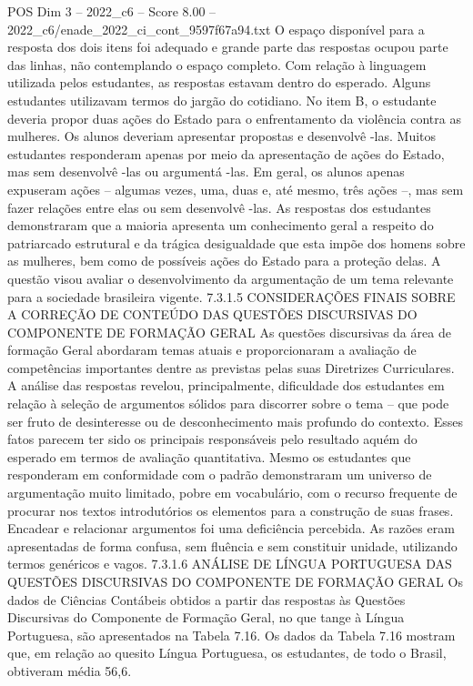 \begin{textsample}{POS Dim 3 – 2022\_c6 – Score 8.00 – 2022\_c6/enade\_2022\_ci\_cont\_9597f67a94.txt}
O espaço disponível para a resposta dos dois itens foi adequado e grande parte das respostas ocupou parte das linhas, não contemplando o espaço completo.
Com relação à linguagem utilizada pelos estudantes, as respostas estavam dentro do esperado.
Alguns estudantes utilizavam termos do jargão do cotidiano.
No item B, o estudante deveria propor duas ações do Estado para o enfrentamento da violência contra as mulheres.
Os alunos deveriam apresentar propostas e desenvolvê -las.
Muitos estudantes responderam apenas por meio da apresentação de ações do Estado, mas sem desenvolvê -las ou argumentá -las.
Em geral, os alunos apenas expuseram ações – algumas vezes, uma, duas e, até mesmo, três ações –, mas sem fazer relações entre elas ou sem desenvolvê -las.
As respostas dos estudantes demonstraram que a maioria apresenta um conhecimento geral a respeito do patriarcado estrutural e da trágica desigualdade que esta impõe dos homens sobre as mulheres, bem como de possíveis ações do Estado para a proteção delas.
A questão visou avaliar o desenvolvimento da argumentação de um tema relevante para a sociedade brasileira vigente. 7.3.1.5 CONSIDERAÇÕES FINAIS SOBRE A CORREÇÃO DE CONTEÚDO DAS QUESTÕES DISCURSIVAS DO COMPONENTE DE FORMAÇÃO GERAL As questões discursivas da área de formação Geral abordaram temas atuais e proporcionaram a avaliação de competências importantes dentre as previstas pelas suas Diretrizes Curriculares.
A análise das respostas revelou, principalmente, dificuldade dos estudantes em relação à seleção de argumentos sólidos para discorrer sobre o tema – que pode ser fruto de desinteresse ou de desconhecimento mais profundo do contexto.
Esses fatos parecem ter sido os principais responsáveis pelo resultado aquém do esperado em termos de avaliação quantitativa.
Mesmo os estudantes que responderam em conformidade com o padrão demonstraram um universo de argumentação muito limitado, pobre em vocabulário, com o recurso frequente de procurar nos textos introdutórios os elementos para a construção de suas frases.
Encadear e relacionar argumentos foi uma deficiência percebida.
As razões eram apresentadas de forma confusa, sem fluência e sem constituir unidade, utilizando termos genéricos e vagos. 7.3.1.6 ANÁLISE DE LÍNGUA PORTUGUESA DAS QUESTÕES DISCURSIVAS DO COMPONENTE DE FORMAÇÃO GERAL Os dados de Ciências Contábeis obtidos a partir das respostas às Questões Discursivas do Componente de Formação Geral, no que tange à Língua Portuguesa, são apresentados na Tabela 7.16.
Os dados da Tabela 7.16 mostram que, em relação ao quesito Língua Portuguesa, os estudantes, de todo o Brasil, obtiveram média 56,6.

\end{textsample}

